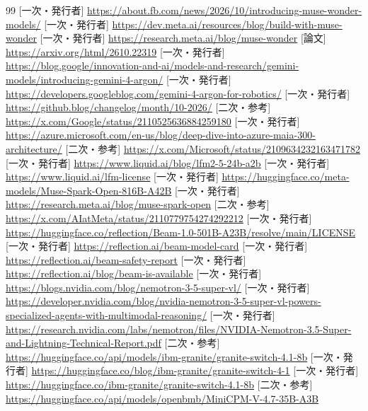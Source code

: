 \documentclass[lualatex,a4paper,10pt]{jlreq}
\begin{document}
\begin{thebibliography}{99}
 [一次・発行者] \url{https://about.fb.com/news/2026/10/introducing-muse-wonder-models/}
 [一次・発行者] \url{https://dev.meta.ai/resources/blog/build-with-muse-wonder}
 [一次・発行者] \url{https://research.meta.ai/blog/muse-wonder}
 [論文] \url{https://arxiv.org/html/2610.22319}
 [一次・発行者] \url{https://blog.google/innovation-and-ai/models-and-research/gemini-models/introducing-gemini-4-argon/}
 [一次・発行者] \url{https://developers.googleblog.com/gemini-4-argon-for-robotics/}
 [一次・発行者] \url{https://github.blog/changelog/month/10-2026/}
 [二次・参考] \url{https://x.com/Google/status/2110525636884259180}
 [一次・発行者] \url{https://azure.microsoft.com/en-us/blog/deep-dive-into-azure-maia-300-architecture/}
 [二次・参考] \url{https://x.com/Microsoft/status/2109634232163471782}
 [一次・発行者] \url{https://www.liquid.ai/blog/lfm2-5-24b-a2b}
 [一次・発行者] \url{https://www.liquid.ai/lfm-license}
 [一次・発行者] \url{https://huggingface.co/meta-models/Muse-Spark-Open-816B-A42B}
 [一次・発行者] \url{https://research.meta.ai/blog/muse-spark-open}
 [二次・参考] \url{https://x.com/AIatMeta/status/2110779754274292212}
 [一次・発行者] \url{https://huggingface.co/reflection/Beam-1.0-501B-A23B/resolve/main/LICENSE}
 [一次・発行者] \url{https://reflection.ai/beam-model-card}
 [一次・発行者] \url{https://reflection.ai/beam-safety-report}
 [一次・発行者] \url{https://reflection.ai/blog/beam-is-available}
 [一次・発行者] \url{https://blogs.nvidia.com/blog/nemotron-3-5-super-vl/}
 [一次・発行者] \url{https://developer.nvidia.com/blog/nvidia-nemotron-3-5-super-vl-powers-specialized-agents-with-multimodal-reasoning/}
 [一次・発行者] \url{https://research.nvidia.com/labs/nemotron/files/NVIDIA-Nemotron-3.5-Super-and-Lightning-Technical-Report.pdf}
 [二次・参考] \url{https://huggingface.co/api/models/ibm-granite/granite-switch-4.1-8b}
 [一次・発行者] \url{https://huggingface.co/blog/ibm-granite/granite-switch-4-1}
 [一次・発行者] \url{https://huggingface.co/ibm-granite/granite-switch-4.1-8b}
 [二次・参考] \url{https://huggingface.co/api/models/openbmb/MiniCPM-V-4.7-35B-A3B}

\end{thebibliography}
\end{document}
